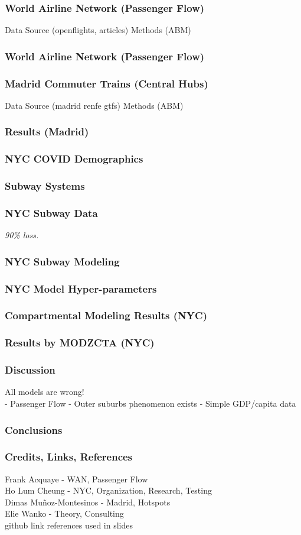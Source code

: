 \documentclass{beamer}
\begin{document}
\begin{frame}
\frametitle{World Airline Network (Passenger Flow)}
Data Source (openflights, articles)
Methods (ABM)
\end{frame}
\begin{frame}
\frametitle{World Airline Network (Passenger Flow)}
\end{frame}
\begin{frame}
\frametitle{Madrid Commuter Trains (Central Hubs)}
Data Source (madrid renfe gtfs)
Methods (ABM)
\end{frame}
\begin{frame}
\frametitle{Results (Madrid)}
\end{frame}
\begin{frame}
\frametitle{NYC COVID Demographics}
\end{frame}
\begin{frame}
\frametitle{Subway Systems}
\end{frame}
\begin{frame}
\frametitle{NYC Subway Data}
\textit{90\% loss.}
\end{frame}
\begin{frame}
\frametitle{NYC Subway Modeling}
\end{frame}
\begin{frame}
\frametitle{NYC Model Hyper-parameters}
\end{frame}
\begin{frame}
\frametitle{Compartmental Modeling Results (NYC)}
\end{frame}
\begin{frame}
\frametitle{Results by MODZCTA (NYC)}
\end{frame}
\begin{frame}
\frametitle{Discussion}
All models are wrong!\\
- Passenger Flow
- Outer suburbs phenomenon exists
- Simple GDP/capita data
\end{frame}
\begin{frame}
\frametitle{Conclusions}
\end{frame}
\begin{frame}
\frametitle{Credits, Links, References}
Frank Acquaye - WAN, Passenger Flow\\
Ho Lum Cheung - NYC, Organization, Research, Testing\\
Dimas Muñoz-Montesinos - Madrid, Hotspots\\
Elie Wanko - Theory, Consulting\\
github link
references used in slides
{}

\end{frame}
\end{document}
